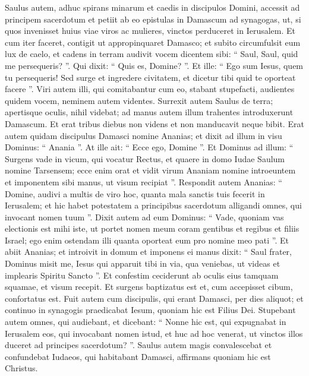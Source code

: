 \begin{biblechapter}
\begin{biblechapter}
\begin{biblechapter}
\begin{biblechapter}
\begin{biblechapter}
\begin{biblechapter}
\begin{biblechapter}
\begin{biblechapter}
\begin{biblechapter}
\verse Saulus autem, adhuc spirans minarum et caedis in discipulos Domini, accessit ad principem sacerdotum 
\verse et petiit ab eo epistulas in Damascum ad synagogas, ut, si quos invenisset huius viae viros ac mulieres, vinctos perduceret in Ierusalem. 
\verse Et cum iter faceret, contigit ut appropinquaret Damasco; et subito circumfulsit eum lux de caelo, 
\verse et cadens in terram audivit vocem dicentem sibi: “ Saul, Saul, quid me persequeris? ”. 
\verse Qui dixit: “ Quis es, Domine? ”. Et ille: “ Ego sum Iesus, quem tu persequeris! 
 \verse Sed surge et ingredere civitatem, et dicetur tibi quid te oporteat facere ”. 
 \verse Viri autem illi, qui comitabantur cum eo, stabant stupefacti, audientes quidem vocem, neminem autem videntes. 
\verse Surrexit autem Saulus de terra; apertisque oculis, nihil videbat; ad manus autem illum trahentes introduxerunt Damascum. 
 \verse Et erat tribus diebus non videns et non manducavit neque bibit.
 \verse Erat autem quidam discipulus Damasci nomine Ananias; et dixit ad illum in visu Dominus: “ Anania ”. At ille ait: “ Ecce ego, Domine ”. 
\verse Et Dominus ad illum: “ Surgens vade in vicum, qui vocatur Rectus, et quaere in domo Iudae Saulum nomine Tarsensem; ecce enim orat 
\verse et vidit virum Ananiam nomine introeuntem et imponentem sibi manus, ut visum recipiat ”. 
\verse Respondit autem Ananias: “ Domine, audivi a multis de viro hoc, quanta mala sanctis tuis fecerit in Ierusalem; 
\verse et hic habet potestatem a principibus sacerdotum alligandi omnes, qui invocant nomen tuum ”. 
\verse Dixit autem ad eum Dominus: “ Vade, quoniam vas electionis est mihi iste, ut portet nomen meum coram gentibus et regibus et filiis Israel; 
\verse ego enim ostendam illi quanta oporteat eum pro nomine meo pati ”.
 \verse Et abiit Ananias; et introivit in domum et imponens ei manus dixit: “ Saul frater, Dominus misit me, Iesus qui apparuit tibi in via, qua veniebas, ut videas et implearis Spiritu Sancto ”. 
\verse Et confestim ceciderunt ab oculis eius tamquam squamae, et visum recepit. Et surgens baptizatus est 
\verse et, cum accepisset cibum, confortatus est.
 Fuit autem cum discipulis, qui erant Damasci, per dies aliquot; 
\verse et continuo in synagogis praedicabat Iesum, quoniam hic est Filius Dei. 
\verse Stupebant autem omnes, qui audiebant, et dicebant: “ Nonne hic est, qui expugnabat in Ierusalem eos, qui invocabant nomen istud, et huc ad hoc venerat, ut vinctos illos duceret ad principes sacerdotum? ”. 
\verse Saulus autem magis convalescebat et confundebat Iudaeos, qui habitabant Damasci, affirmans quoniam hic est Christus. 

\end{biblechapter}
\end{biblechapter}
\end{biblechapter}
\end{biblechapter}
\end{biblechapter}
\end{biblechapter}
\end{biblechapter}
\end{biblechapter}
\end{biblechapter}
